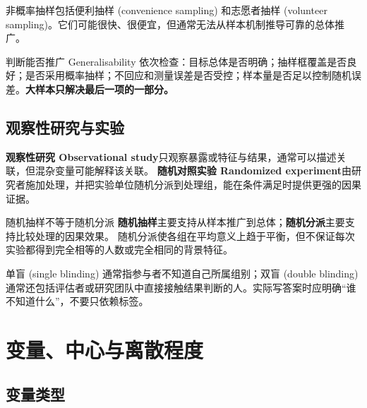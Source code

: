 \documentclass[11pt,a4paper,fontset=fandol]{ctexart}
\begin{document}
非概率抽样包括便利抽样 (convenience sampling) 和志愿者抽样 (volunteer sampling)。它们可能很快、很便宜，但通常无法从样本机制推导可靠的总体推广。

\begin{methodbox}{判断能否推广 Generalisability}
依次检查：目标总体是否明确；抽样框覆盖是否良好；是否采用概率抽样；不回应和测量误差是否受控；样本量是否足以控制随机误差。\textbf{大样本只解决最后一项的一部分。}
\end{methodbox}

\subsection{观察性研究与实验}

\textbf{观察性研究 Observational study}只观察暴露或特征与结果，通常可以描述关联，但混杂变量可能解释该关联。
\textbf{随机对照实验 Randomized experiment}由研究者施加处理，并把实验单位随机分派到处理组，能在条件满足时提供更强的因果证据。

\begin{center}
\end{center}

\begin{trapbox}{随机抽样不等于随机分派}
\textbf{随机抽样}主要支持从样本推广到总体；\textbf{随机分派}主要支持比较处理的因果效果。
随机分派使各组在平均意义上趋于平衡，但不保证每次实验都得到完全相等的人数或完全相同的背景特征。
\end{trapbox}

单盲 (single blinding) 通常指参与者不知道自己所属组别；双盲 (double blinding) 通常还包括评估者或研究团队中直接接触结果判断的人。实际写答案时应明确“谁不知道什么”，不要只依赖标签。

\section{变量、中心与离散程度}

\subsection{变量类型}
\end{document}
